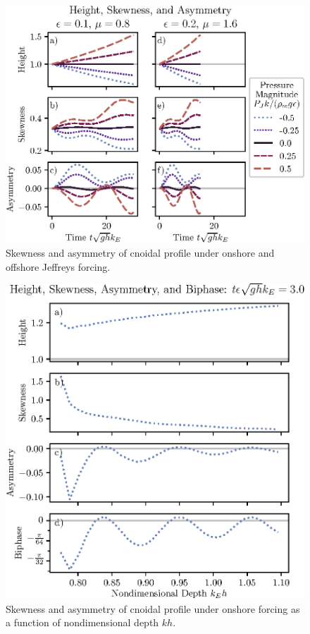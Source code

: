 \documentclass{jfm}
\begin{document}
\begin{figure}
  \centering
  \includegraphics{Skew-Asymm-Cnoidal.eps}
  \caption{
    Skewness and asymmetry of cnoidal profile under onshore and offshore
    Jeffreys forcing.
  }
\end{figure}

\begin{figure}
  \centering
  \includegraphics{Skew-Asymm-Cnoidal-kh.eps}
  \caption{
    Skewness and asymmetry of cnoidal profile under onshore forcing as a
    function of nondimensional depth $kh$.
  }
\end{figure}
\end{document}
